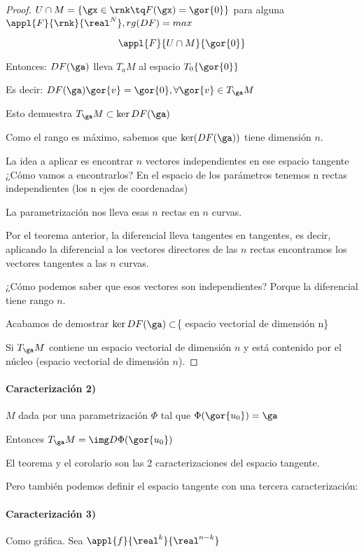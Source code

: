 \begin{proof}
$U\cap M =\{ \gx \in \rnk \tq F(\gx) = \gor{0}\}$ para alguna $\appl{F}{\rnk}{\real^N}, rg(DF) = max$

\[\appl{F}{U\cap M}{\gor{0}}\]

Entonces: $DF(\ga)$ lleva $T_a M$ al espacio $T_0\{\gor{0}\}$

Es decir: $DF(\ga)\gor{v} = \gor{0}, \forall \gor{v}\in T_{\ga} M$

Esto demuestra $T_{\ga} M \subset \ker DF(\ga)$

Como el rango es máximo, sabemos que $\ker(DF(\ga))$ tiene dimensión $n$.

La idea a aplicar es encontrar $n$ vectores independientes en ese espacio tangente ¿Cómo vamos a encontrarlos? En el espacio de los parámetros tenemos n rectas independientes (los n ejes de coordenadas)

La parametrización nos lleva esas $n$ rectas en $n$ curvas. 

Por el teorema anterior, la diferencial lleva tangentes en tangentes, es decir, aplicando la diferencial a los vectores directores de las $n$ rectas encontramos los vectores tangentes a las $n$ curvas. 

¿Cómo podemos saber que esos vectores son independientes? Porque la diferencial tiene rango $n$.

Acabamos de demostrar  $\ker DF(\ga) \subset $\{ espacio vectorial de dimensión n\} 

Si $T_{\ga} M$ contiene un espacio vectorial de dimensión $n$ y está contenido por el núcleo (espacio vectorial de dimensión $n$).
\end{proof}

\paragraph{Caracterización 2)}
\begin{corol}
\label{CaractSubv_2}
$M$ dada por una parametrización $\Phi$ tal que $\Phi(\gor{u_0}) = \ga$ 

Entonces $T_{\ga} M = \img D\Phi(\gor{u_0})$

\end{corol}


El teorema y el corolario son las 2 caracterizaciones del espacio tangente.

Pero también podemos definir el espacio tangente con una tercera caracterización:

\paragraph{Caracterización 3)} Como gráfica. Sea $\appl{f}{\real^k}{\real^{n-k}}$

